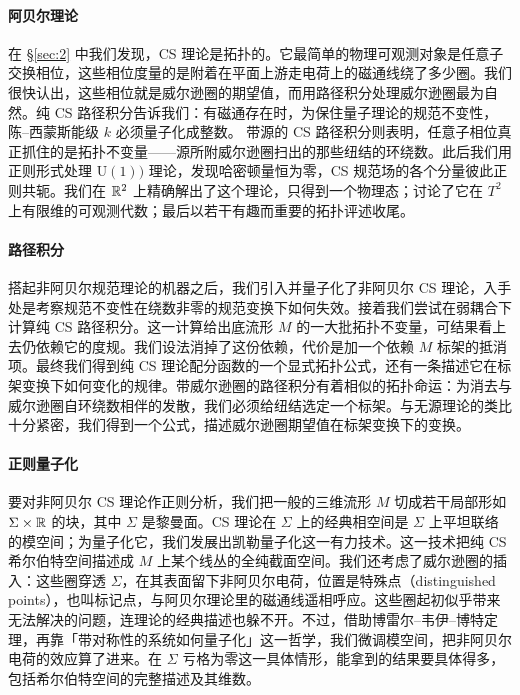 \paragraph{阿贝尔理论}
在 \S\ref{sec:2} 中我们发现，CS 理论是拓扑的。它最简单的物理可观测对象是任意子交换相位，这些相位度量的是附着在平面上游走电荷上的磁通线绕了多少圈。我们很快认出，这些相位就是威尔逊圈的期望值，而用路径积分处理威尔逊圈最为自然。纯 CS 路径积分告诉我们：有磁通存在时，为保住量子理论的规范不变性，陈--西蒙斯能级 $k$ 必须量子化成整数。
带源的 CS 路径积分则表明，任意子相位真正抓住的是拓扑不变量——源所附威尔逊圈扫出的那些纽结的环绕数。此后我们用正则形式处理 $\mathrm{U}(1))$ 理论，发现哈密顿量恒为零，CS 规范场的各个分量彼此正则共轭。我们在 $\mathbb{R}^2$ 上精确解出了这个理论，只得到一个物理态；讨论了它在 $T^2$ 上有限维的可观测代数；最后以若干有趣而重要的拓扑评述收尾。

\paragraph{路径积分}
搭起非阿贝尔规范理论的机器之后，我们引入并量子化了非阿贝尔 CS 理论，入手处是考察规范不变性在绕数非零的规范变换下如何失效。接着我们尝试在弱耦合下计算纯 CS 路径积分。这一计算给出底流形 $M$ 的一大批拓扑不变量，可结果看上去仍依赖它的度规。我们设法消掉了这份依赖，代价是加一个依赖 $M$ 标架的抵消项。最终我们得到纯 CS 理论配分函数的一个显式拓扑公式，还有一条描述它在标架变换下如何变化的规律。带威尔逊圈的路径积分有着相似的拓扑命运：为消去与威尔逊圈自环绕数相伴的发散，我们必须给纽结选定一个标架。与无源理论的类比十分紧密，我们得到一个公式，描述威尔逊圈期望值在标架变换下的变换。

\paragraph{正则量子化}
要对非阿贝尔 CS 理论作正则分析，我们把一般的三维流形 $M$ 切成若干局部形如 $\Sigma\times\mathbb{R}$ 的块，其中 $\Sigma$ 是黎曼面。CS 理论在 $\Sigma$ 上的经典相空间是 $\Sigma$ 上平坦联络的模空间；为量子化它，我们发展出凯勒量子化这一有力技术。这一技术把纯 CS 希尔伯特空间描述成 $M$ 上某个线丛的全纯截面空间。我们还考虑了威尔逊圈的插入：这些圈穿透 $\Sigma$，在其表面留下非阿贝尔电荷，位置是特殊点（distinguished points），也叫标记点，与阿贝尔理论里的磁通线遥相呼应。这些圈起初似乎带来无法解决的问题，连理论的经典描述也躲不开。不过，借助博雷尔--韦伊--博特定理，再靠「带对称性的系统如何量子化」这一哲学，我们微调模空间，把非阿贝尔电荷的效应算了进来。在 $\Sigma$ 亏格为零这一具体情形，能拿到的结果要具体得多，包括希尔伯特空间的完整描述及其维数。

